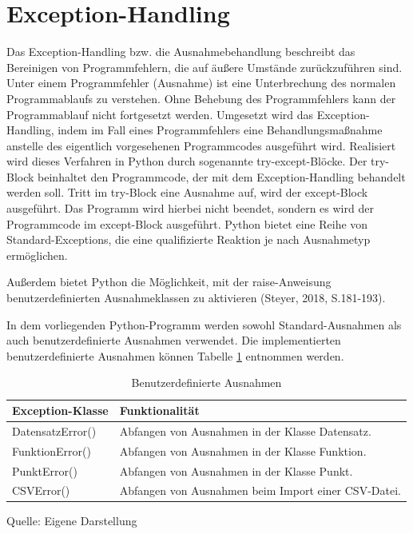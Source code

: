 \documentclass[
    a4paper, 								%
    oneside, 								%
    11pt, 									%
    listof=totoc, 					%
    bibliography=totoc, 		%
    final, 									%
    numbers=noenddot
]{scrreprt}
\begin{document}
\section{Exception-Handling}
\label{sec:Exception}
Das Exception-Handling bzw. die Ausnahmebehandlung beschreibt das Bereinigen von Programmfehlern, die auf äußere Umstände zurückzuführen sind. Unter einem Programmfehler (Ausnahme) ist eine Unterbrechung des normalen Programmablaufs zu verstehen. Ohne Behebung des Programmfehlers kann der Programmablauf nicht fortgesetzt werden. Umgesetzt wird das Exception-Handling, indem im Fall eines Programmfehlers eine Behandlungsmaßnahme anstelle des eigentlich vorgesehenen Programmcodes ausgeführt wird. Realisiert wird dieses Verfahren in Python durch sogenannte try-except-Blöcke. Der try-Block beinhaltet den Programmcode, der mit dem Exception-Handling behandelt werden soll. Tritt im try-Block eine Ausnahme auf, wird der except-Block ausgeführt. Das Programm wird hierbei nicht beendet, sondern es wird der Programmcode im except-Block ausgeführt.  Python bietet eine Reihe von Standard-Exceptions, die eine qualifizierte Reaktion je nach Ausnahmetyp ermöglichen. 

Außerdem bietet Python die Möglichkeit, mit der raise-Anweisung benutzerdefinierten Ausnahmeklassen zu aktivieren (Steyer, 2018, S.181-193).

In dem vorliegenden Python-Programm werden sowohl Standard-Ausnahmen als auch benutzerdefinierte Ausnahmen verwendet. Die implementierten benutzerdefinierte Ausnahmen können Tabelle \ref{tab:ben_Ausnahmen} entnommen werden.
\begin{table}[!h]
\caption{Benutzerdefinierte Ausnahmen}
\vspace{6pt}
\centering
\begin{tabularx}{0.95\textwidth}{|l|X|}
\hline
\textbf{Exception-Klasse} & \textbf{Funktionalität}\\
\hline
DatensatzError() & Abfangen von Ausnahmen in der Klasse Datensatz.\\
\hline
FunktionError() & Abfangen von Ausnahmen in der Klasse Funktion.\\
\hline
PunktError() & Abfangen von Ausnahmen in der Klasse Punkt.\\
\hline
CSVError() & Abfangen von Ausnahmen beim Import einer CSV-Datei.\\
\hline
\end{tabularx}
\vspace{6pt}

Quelle: Eigene Darstellung

\label{tab:ben_Ausnahmen}
\end{table}
\end{document}
